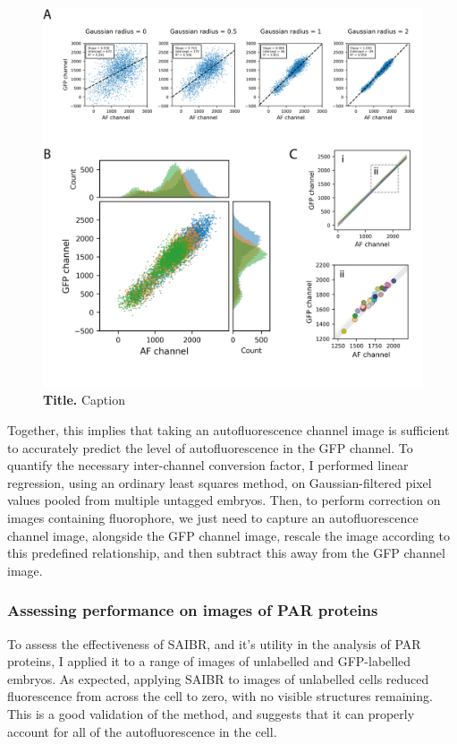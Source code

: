 \documentclass[12pt]{"article"}
\newcommand{\mycaption}[2]{\caption[#1]{\textbf{#1.} #2}}
\begin{document}
\begin{figure}[!h]
\includegraphics[scale=0.95]{saibr_n2_correlation}
\setlength{\abovecaptionskip}{20pt}
\centering
\mycaption{Title}{Caption}
\end{figure}


Together, this implies that taking an autofluorescence channel image is sufficient to accurately predict the level of autofluorescence in the GFP channel. To quantify the necessary inter-channel conversion factor, I performed linear regression, using an ordinary least squares method, on Gaussian-filtered pixel values pooled from multiple untagged embryos. Then, to perform correction on images containing fluorophore, we just need to capture an autofluorescence channel image, alongside the GFP channel image, rescale the image according to this predefined relationship, and then subtract this away from the GFP channel image.\\


\subsubsection{Assessing performance on images of PAR proteins}

To assess the effectiveness of SAIBR, and it’s utility in the analysis of PAR proteins, I applied it to a range of images of unlabelled and GFP-labelled embryos. As expected, applying SAIBR to images of unlabelled cells reduced fluorescence from across the cell to zero, with no visible structures remaining. This is a good validation of the method, and suggests that it can properly account for all of the autofluorescence in the cell. \\
\end{document}
